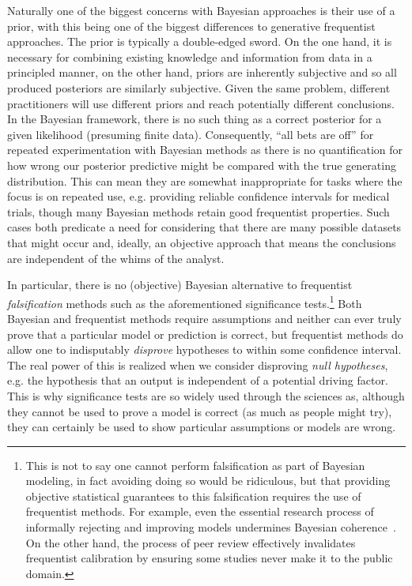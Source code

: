 Naturally one of the biggest concerns with Bayesian approaches is their use of a prior, with this being
one of the biggest differences to generative frequentist approaches.  The prior is typically a double-edged
sword.  On the one hand, it is necessary for combining existing knowledge and information from data 
in a principled manner, on the other hand, priors are inherently subjective and so all produced posteriors are
similarly subjective.  Given the same problem, different practitioners will use different priors and reach
potentially different conclusions.  In the Bayesian framework, there is no such thing
as a correct posterior for a given likelihood (presuming finite data).
Consequently, ``all bets are off'' for repeated experimentation with Bayesian methods as there is no
quantification for how wrong our posterior predictive might be compared with the true generating
distribution.  This can mean they  are somewhat inappropriate for tasks where the focus is on repeated use,
e.g. providing reliable confidence intervals for medical trials, though many Bayesian methods retain
good frequentist properties.  Such cases both predicate a need for
considering that there are many possible datasets that might occur and, ideally, an objective approach
that means the conclusions are independent of the whims of the analyst.

In particular, there is no (objective) Bayesian alternative to frequentist
\emph{falsification} methods such as the aforementioned significance tests.\footnote{This is not to say one cannot 
	perform falsification as part of Bayesian modeling, in fact avoiding doing so would
	be ridiculous, but that providing objective statistical guarantees to this falsification requires the use of
	frequentist methods.  For example, even the essential research process of informally
	rejecting and improving models undermines Bayesian coherence~\citep{gelman2011induction}.  On the other hand, the
	process of peer review effectively
	invalidates frequentist calibration by ensuring some studies never make it to the public domain.}
  Both Bayesian and frequentist methods require assumptions
and neither can ever truly prove that a particular model or prediction is correct, but frequentist methods do
allow one to indisputably \emph{disprove} hypotheses to within some confidence interval.  The real power
of this is realized when we consider disproving \emph{null hypotheses}, e.g. the hypothesis that an
output is independent of a potential driving factor.  This is why significance tests are so widely
used through the sciences as, although they cannot be used to prove
a model is correct (as much as people might try), they can certainly be used to show 
particular assumptions or models are wrong.

